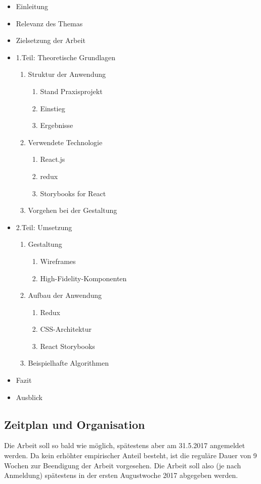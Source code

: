 \begin{itemize}
  \item Einleitung
  \item Relevanz des Themas
  \item Zielsetzung der Arbeit
  \item 1.Teil: Theoretische Grundlagen
  \begin{enumerate}
    \item Struktur der Anwendung
    \begin{enumerate}
      \item Stand Praxisprojekt
      \item Einstieg
      \item Ergebnisse
    \end{enumerate}
    \item Verwendete Technologie
    \begin{enumerate}
      \item React.js
      \item redux
      \item Storybooks for React
    \end{enumerate}
    \item Vorgehen bei der Gestaltung
  \end{enumerate}
  \item 2.Teil: Umsetzung
  \begin{enumerate}
    \item Gestaltung
    \begin{enumerate}
      \item Wireframes
      \item High-Fidelity-Komponenten
    \end{enumerate}
    \item Aufbau der Anwendung
    \begin{enumerate}
      \item Redux
      \item CSS-Architektur
      \item React Storybooks
    \end{enumerate}
    \item Beispielhafte Algorithmen
  \end{enumerate}
  \item Fazit
  \item Ausblick
\end{itemize}

\subsection{Zeitplan und Organisation}
Die Arbeit soll so bald wie möglich, spätestens aber am 31.5.2017 angemeldet werden. Da kein erhöhter empirischer Anteil besteht, ist die reguläre Dauer von 9 Wochen zur Beendigung der Arbeit vorgesehen. Die Arbeit soll also (je nach Anmeldung) spätestens in der ersten Augustwoche 2017 abgegeben werden.


